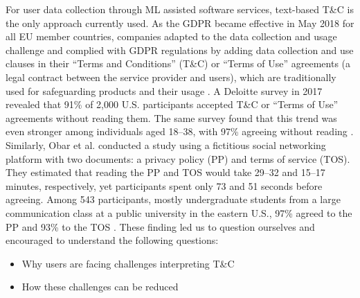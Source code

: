 \documentclass[manuscript,review,anonymous]{acmart}
\begin{document}
	For user data collection through ML assisted software services, text-based T\&C is the only approach currently used. As the GDPR became effective in May 2018 for all EU member countries, companies adapted to the data collection and usage challenge and complied with GDPR regulations by adding data collection and use clauses in their \enquote{Terms and Conditions} (T\&C) or \enquote{Terms of Use} agreements (a legal contract between the service provider and users), which are traditionally used for safeguarding products and their usage \cite{buttarelli_we_2019}. A Deloitte survey in 2017 revealed that 91\% of 2,000 U.S. participants accepted T\&C or \enquote{Terms of Use} agreements without reading them. The same survey found that this trend was even stronger among individuals aged 18–38, with 97\% agreeing without reading \cite{cakebread_youre_2014}. Similarly, Obar et al. conducted a study using a fictitious social networking platform with two documents: a privacy policy (PP) and terms of service (TOS). They estimated that reading the PP and TOS would take 29–32 and 15–17 minutes, respectively, yet participants spent only 73 and 51 seconds before agreeing. Among 543 participants, mostly undergraduate students from a large communication class at a public university in the eastern U.S., 97\% agreed to the PP and 93\% to the TOS \cite{obar_biggest_2016}. These finding led us to question ourselves and encouraged to understand the following questions:

	\begin{itemize}
		\item Why users are facing challenges interpreting T\&C
		\item How these challenges can be reduced
	\end{itemize}
\end{document}
